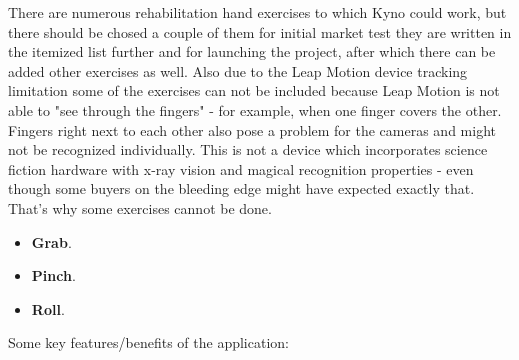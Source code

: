 There are numerous rehabilitation hand exercises to which Kyno could work, but there should be chosed a couple of them for initial market test they are written in the itemized list further and for launching the project, after which there can be added other exercises as well. Also due to the Leap Motion device tracking limitation some of the exercises can not be included because Leap Motion is not able to "see through the fingers" - for example, when one finger covers the other. Fingers right next to each other also pose a problem for the cameras and might not be recognized individually. This is not a device which incorporates science fiction hardware with x-ray vision and magical recognition properties - even though some buyers on the bleeding edge might have expected exactly that. That's why some exercises cannot be done.
\begin{itemize}
\item \textbf{Grab}.
\item \textbf{Pinch}.
\item \textbf {Roll}.
\end{itemize}
Some key features/benefits of the application:
